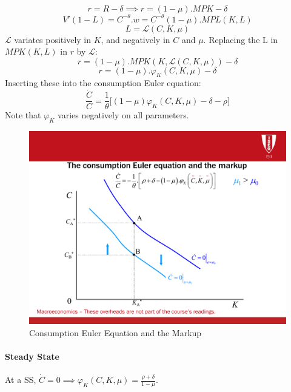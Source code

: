 \begin{equation*}
    r=R-\delta \implies r=(1-\mu).MPK-\delta
\end{equation*}
\begin{equation*}
    V'(1-L)=C^{-\theta}.w=C^{-\theta}(1-\mu).MPL(K,L)
\end{equation*}
\begin{equation*}
    L=\mathcal{L}(C,K,\mu)
\end{equation*}
$\mathcal{L}$ variates positively in $K$, and negatively in $C$ and $\mu$.
Replacing the L in $MPK(K,L)$ in $r$ by $\mathcal{L}$:
\begin{equation*}
        r=(1-\mu).MPK(K,\mathcal{L}(C,K,\mu))-\delta 
\end{equation*}
\begin{equation*}
        r=(1-\mu).\varphi_{K}(C,K,\mu)-\delta
\end{equation*}
Inserting these into the consumption Euler equation: 
\begin{equation*}
    \frac{\dot{C}}{C}=\frac{1}{\theta}\bigg[(1-\mu)\varphi_{K}(C,K,\mu)-\delta-\rho \bigg]
\end{equation*}
Note that $\varphi_{K}$ varies negatively on all parameters. 
\begin{figure}[H]
    \centering
    \includegraphics[max width=\linewidth]{5_0_The_New_Macroeconomics/Consumption_Euler_graph.pdf}
    \caption{Consumption Euler Equation and the Markup}
    \label{Consumption_Euler_Eq_Markup}
\end{figure}

 \paragraph{Steady State}
At a SS, $\dot{C}=0 \implies \varphi_{K}(C,K,\mu)=\frac{\rho+\delta}{1-\mu}$. 

